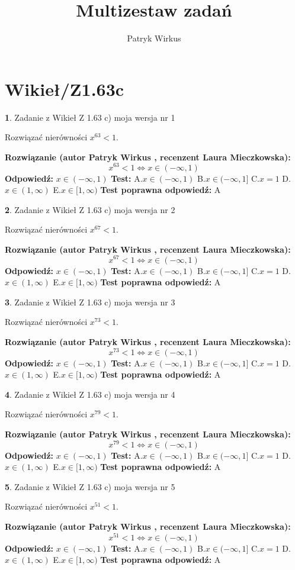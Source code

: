\documentclass[12pt, a4paper]{article}
\title{Multizestaw zadań}
\author{Patryk Wirkus}
\date{}
\theoremstyle{definition} %
\newtheorem{zad}{}
\newcommand{\kategoria}[1]{\section{#1}}
\newcommand{\zadStart}[1]{\begin{zad}#1\newline}
\newcommand{\zadStop}{\end{zad}}
\newcommand{\rozwStart}[2]{\noindent \textbf{Rozwiązanie (autor #1 , recenzent #2): }\newline}
\newcommand{\rozwStop}{\newline}
\newcommand{\odpStart}{\noindent \textbf{Odpowiedź:}\newline}
\newcommand{\odpStop}{\newline}
\newcommand{\testStart}{\noindent \textbf{Test:}\newline}
\newcommand{\testStop}{\newline}
\newcommand{\kluczStart}{\noindent \textbf{Test poprawna odpowiedź:}\newline}
\newcommand{\kluczStop}{\newline}
\begin{document}
\maketitle

\kategoria{Wikieł/Z1.63c}


\zadStart{Zadanie z Wikieł Z 1.63 c) moja wersja nr 1}

Rozwiązać nierówności $x^{63} < 1$.
\zadStop
\rozwStart{Patryk Wirkus}{Laura Mieczkowska}
$$x^{63} < 1 \iff x \in (-\infty,1)$$
\rozwStop
\odpStart
$x \in (-\infty,1)$
\odpStop
\testStart
A.$x \in (-\infty,1)$ B.$x \in (-\infty,1]$ C.$x = 1$ D.$x \in (1,\infty)$ E.$x \in [1,\infty)$
\testStop
\kluczStart
A
\kluczStop



\zadStart{Zadanie z Wikieł Z 1.63 c) moja wersja nr 2}

Rozwiązać nierówności $x^{67} < 1$.
\zadStop
\rozwStart{Patryk Wirkus}{Laura Mieczkowska}
$$x^{67} < 1 \iff x \in (-\infty,1)$$
\rozwStop
\odpStart
$x \in (-\infty,1)$
\odpStop
\testStart
A.$x \in (-\infty,1)$ B.$x \in (-\infty,1]$ C.$x = 1$ D.$x \in (1,\infty)$ E.$x \in [1,\infty)$
\testStop
\kluczStart
A
\kluczStop



\zadStart{Zadanie z Wikieł Z 1.63 c) moja wersja nr 3}

Rozwiązać nierówności $x^{73} < 1$.
\zadStop
\rozwStart{Patryk Wirkus}{Laura Mieczkowska}
$$x^{73} < 1 \iff x \in (-\infty,1)$$
\rozwStop
\odpStart
$x \in (-\infty,1)$
\odpStop
\testStart
A.$x \in (-\infty,1)$ B.$x \in (-\infty,1]$ C.$x = 1$ D.$x \in (1,\infty)$ E.$x \in [1,\infty)$
\testStop
\kluczStart
A
\kluczStop



\zadStart{Zadanie z Wikieł Z 1.63 c) moja wersja nr 4}

Rozwiązać nierówności $x^{79} < 1$.
\zadStop
\rozwStart{Patryk Wirkus}{Laura Mieczkowska}
$$x^{79} < 1 \iff x \in (-\infty,1)$$
\rozwStop
\odpStart
$x \in (-\infty,1)$
\odpStop
\testStart
A.$x \in (-\infty,1)$ B.$x \in (-\infty,1]$ C.$x = 1$ D.$x \in (1,\infty)$ E.$x \in [1,\infty)$
\testStop
\kluczStart
A
\kluczStop



\zadStart{Zadanie z Wikieł Z 1.63 c) moja wersja nr 5}

Rozwiązać nierówności $x^{51} < 1$.
\zadStop
\rozwStart{Patryk Wirkus}{Laura Mieczkowska}
$$x^{51} < 1 \iff x \in (-\infty,1)$$
\rozwStop
\odpStart
$x \in (-\infty,1)$
\odpStop
\testStart
A.$x \in (-\infty,1)$ B.$x \in (-\infty,1]$ C.$x = 1$ D.$x \in (1,\infty)$ E.$x \in [1,\infty)$
\testStop
\kluczStart
A
\kluczStop
\end{document}
